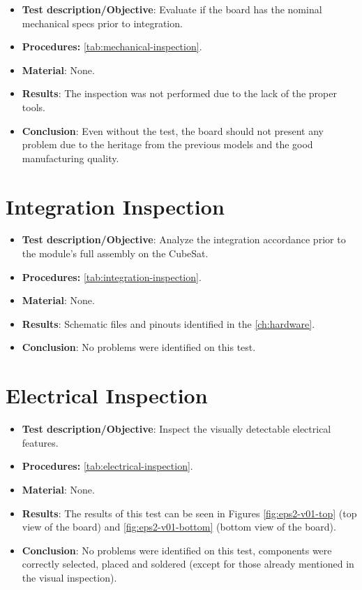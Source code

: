 \begin{itemize}
    \item \textbf{Test description/Objective}: Evaluate if the board has the nominal mechanical specs prior to integration.
    \item \textbf{Procedures:} \autoref{tab:mechanical-inspection}.
    \item \textbf{Material}: None.
    \item \textbf{Results}: The inspection was not performed due to the lack of the proper tools.
    \item \textbf{Conclusion}: Even without the test, the board should not present any problem due to the heritage from the previous models and the good manufacturing quality.
\end{itemize}


\section{Integration Inspection}

\begin{itemize}
    \item \textbf{Test description/Objective}: Analyze the integration accordance prior to the module’s full assembly on the CubeSat.
    \item \textbf{Procedures:} \autoref{tab:integration-inspection}.
    \item \textbf{Material}: None.
    \item \textbf{Results}: Schematic files and pinouts identified in the \autoref{ch:hardware}. 
    \item \textbf{Conclusion}: No problems were identified on this test.
\end{itemize}


\section{Electrical Inspection}

\begin{itemize}
    \item \textbf{Test description/Objective}: Inspect the visually detectable electrical features.
    \item \textbf{Procedures:} \autoref{tab:electrical-inspection}.
    \item \textbf{Material}: None.
    \item \textbf{Results}: The results of this test can be seen in Figures \ref{fig:eps2-v01-top} (top view of the board) and \ref{fig:eps2-v01-bottom} (bottom view of the board).
    \item \textbf{Conclusion}: No problems were identified on this test, components were correctly selected, placed and soldered (except for those already mentioned in the visual inspection).
\end{itemize}


